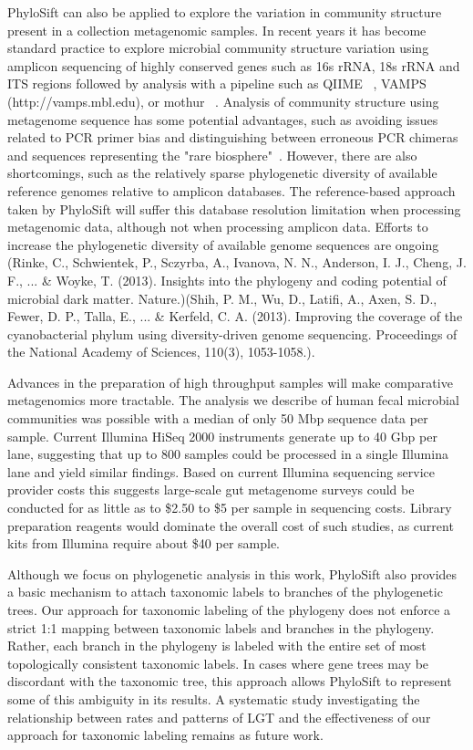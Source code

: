 \documentclass[10pt]{article}
\begin{document}
PhyloSift can also be applied to explore the variation in community structure present in a collection metagenomic samples.
In recent years it has become standard practice to explore microbial community structure variation using amplicon sequencing of highly conserved genes such as 16s rRNA, 18s rRNA and ITS regions followed by analysis with a pipeline such as QIIME ~\cite{Caporaso2010}, VAMPS (http://vamps.mbl.edu), or mothur ~\cite{schloss2009}.
Analysis of community structure using metagenome sequence has some potential advantages, such as avoiding issues related to PCR primer bias and distinguishing between erroneous PCR chimeras and sequences representing the "rare biosphere"~\cite{Bik2012}.
However, there are also shortcomings, such as the relatively sparse phylogenetic diversity of available reference genomes relative to amplicon databases.
The reference-based approach taken by PhyloSift will suffer this database resolution limitation when processing metagenomic data, although not when processing amplicon data.
Efforts to increase the phylogenetic diversity of available genome sequences are ongoing~\cite{Wu2009} (Rinke, C., Schwientek, P., Sczyrba, A., Ivanova, N. N., Anderson, I. J., Cheng, J. F., ... & Woyke, T. (2013). Insights into the phylogeny and coding potential of microbial dark matter. Nature.)(Shih, P. M., Wu, D., Latifi, A., Axen, S. D., Fewer, D. P., Talla, E., ... & Kerfeld, C. A. (2013). Improving the coverage of the cyanobacterial phylum using diversity-driven genome sequencing. Proceedings of the National Academy of Sciences, 110(3), 1053-1058.).

Advances in the preparation of high throughput samples will make comparative metagenomics more tractable.
The analysis we describe of human fecal microbial communities was possible with a median of only 50 Mbp sequence data per sample.
Current Illumina HiSeq 2000 instruments generate up to 40 Gbp per lane, suggesting that up to 800 samples could be processed in a single Illumina lane and yield similar findings.
Based on current Illumina sequencing service provider costs this suggests large-scale gut metagenome surveys could be conducted for as little as to \$2.50 to \$5 per sample in sequencing costs.
Library preparation reagents would dominate the overall cost of such studies, as current kits from Illumina require about \$40 per sample.

Although we focus on phylogenetic analysis in this work, PhyloSift also provides a basic mechanism to attach taxonomic labels to branches of the phylogenetic trees.
Our approach for taxonomic labeling of the phylogeny does not enforce a strict 1:1 mapping between taxonomic labels and  branches in the phylogeny.
Rather, each branch in the phylogeny is labeled with the entire set of most topologically consistent taxonomic labels.
In cases where gene trees may be discordant with the taxonomic tree, this approach allows PhyloSift to represent some of this ambiguity in its results.
A systematic study investigating the relationship between rates and patterns of LGT and the effectiveness of our approach for taxonomic labeling remains as future work.
\end{document}
